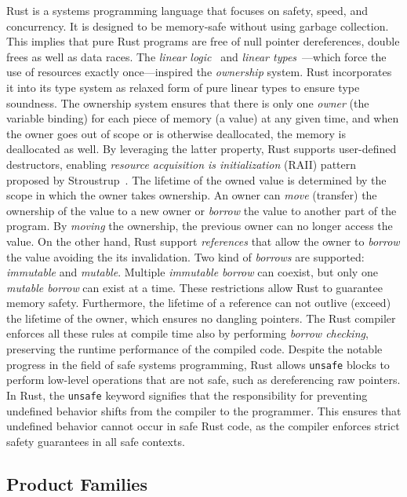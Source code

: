 Rust is a systems programming language that focuses on safety, speed, and concurrency. It is designed to be memory-safe without using garbage collection. 
This implies that pure Rust programs are free of null pointer dereferences, double frees as well as data races.
The \emph{linear logic}~\cite{Girard87, Girard95} and \emph{linear types}~\cite{Wadler90, Odersky92}---which force the use of resources exactly once---inspired the \emph{ownership} system.
Rust incorporates it into its type system as relaxed form of pure linear types to ensure type soundness.
The ownership system ensures that there is only one \emph{owner} (the variable binding) for each piece of memory (a value) at any given time, and when the owner goes out of scope or is otherwise deallocated, the memory is deallocated as well. By leveraging the latter property, Rust supports user-defined destructors, enabling \emph{resource acquisition is initialization} (RAII) pattern proposed by Stroustrup~\cite{Stroustrup94}.
The lifetime of the owned value is determined by the scope in which the owner takes ownership.
An owner can \emph{move} (transfer) the ownership of the value to a new owner or \emph{borrow} the value to another part of the program.
By \emph{moving} the ownership, the previous owner can no longer access the value.
On the other hand, Rust support \emph{references} that allow the owner to \emph{borrow} the value avoiding the its invalidation.
Two kind of \emph{borrows} are supported: \emph{immutable} and \emph{mutable}.
Multiple \emph{immutable borrow} can coexist, but only one \emph{mutable borrow} can exist at a time. 
These restrictions allow Rust to guarantee memory safety. Furthermore, the lifetime of a reference can not outlive (exceed) the lifetime of the owner, which ensures no dangling pointers.
The Rust compiler enforces all these rules at compile time also by performing \emph{borrow checking}, preserving the runtime performance of the compiled code.
Despite the notable progress in the field of safe systems programming, Rust allows \texttt{unsafe} blocks to perform low-level operations that are not safe, such as dereferencing raw pointers.
In Rust, the \texttt{unsafe} keyword signifies that the responsibility for preventing undefined behavior shifts from the compiler to the programmer. This ensures that undefined behavior cannot occur in safe Rust code, as the compiler enforces strict safety guarantees in all safe contexts.

\subsection{Product Families}\label{subsec:bg:spl}

